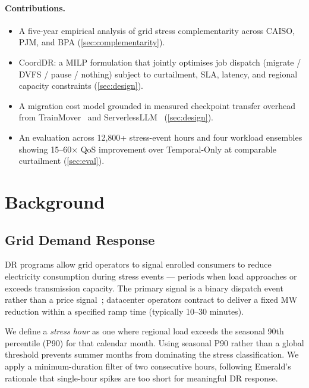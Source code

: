 \documentclass[sigplan,10pt,review]{acmart}
\newcommand{\sysname}{CoordDR\xspace}
\begin{document}
\paragraph{Contributions.}
\begin{itemize}
  \item A five-year empirical analysis of grid stress complementarity across
        CAISO, PJM, and BPA (\cref{sec:complementarity}).
  \item \sysname: a MILP formulation that jointly optimises job dispatch
        (migrate / DVFS / pause / nothing) subject to curtailment, SLA,
        latency, and regional capacity constraints (\cref{sec:design}).
  \item A migration cost model grounded in measured checkpoint transfer
        overhead from TrainMover~\cite{trainmover2024} and
        ServerlessLLM~\cite{serverlessllm2024} (\cref{sec:design}).
  \item An evaluation across 12,800+ stress-event hours and four workload
        ensembles showing 15--60$\times$ QoS improvement over Temporal-Only
        at comparable curtailment (\cref{sec:eval}).
\end{itemize}


\section{Background}
\label{sec:background}

\subsection{Grid Demand Response}

DR programs allow grid operators to signal enrolled consumers to reduce
electricity consumption during stress events — periods when load approaches
or exceeds transmission capacity.  The primary signal is a binary dispatch
event rather than a price signal~\cite{emerald2025}; datacenter operators
contract to deliver a fixed MW reduction within a specified ramp time
(typically 10--30 minutes).

We define a \emph{stress hour} as one where regional load exceeds the
seasonal 90th percentile (P90) for that calendar month.  Using seasonal P90
rather than a global threshold prevents summer months from dominating the
stress classification.  We apply a minimum-duration filter of two consecutive
hours, following Emerald's rationale that single-hour spikes are too short
for meaningful DR response.
\end{document}
